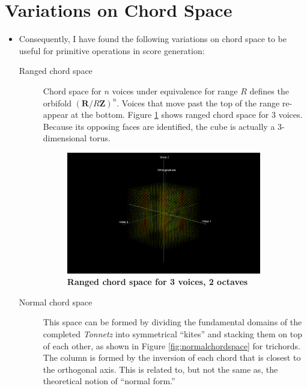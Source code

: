 \documentclass[14pt,letterpaper,onecolumn]{scrartcl}
\begin{document}
\section{Variations on Chord Space}

\begin{itemize}

\item Consequently, I have found the following variations on chord space to be useful for primitive operations in score generation: 

\begin{description}
	
\item[Ranged chord space] Chord space for $n$ voices under equivalence for range $R$ defines the orbifold $\left( \textbf{R}/R\textbf{Z}\right)^{n}$. Voices that move past the top of the range re-appear at the bottom. Figure \ref{fig:rangedchordspace} shows ranged chord space for 3 voices. Because its opposing faces are identified, the cube is actually a 3-dimensional torus.

\begin{figure}[htbp]
  \begin{center}
		\includegraphics[trim=290 80 270 0,width=8.5cm,clip]{rangedchordspace} 
	\caption{\textbf{Ranged chord space for 3 voices, 2 octaves}}
	\label{fig:rangedchordspace}
  \end{center}
\end{figure}

\item[Normal chord space] This space can be formed by dividing the fundamental domains of the completed \emph{Tonnetz} into symmetrical ``kites'' and stacking them on top of each other, as shown in Figure \ref{fig:normalchordspace} for trichords. The column is formed by the inversion of each chord that is closest to the orthogonal axis. This is related to, but not the same as, the theoretical notion of ``normal form.''


\end{description}
\end{itemize}
\end{document}
